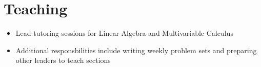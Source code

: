 \section{Teaching}

{
\begin{itemize}
    \item Lead tutoring sessions for Linear Algebra and Multivariable Calculus
    \item Additional responsbilities include writing weekly problem sets and preparing other leaders to teach sections
\end{itemize}
}